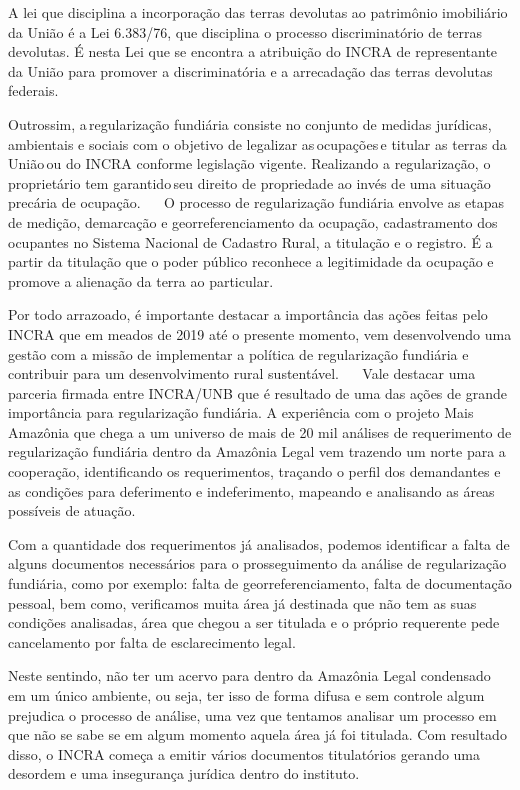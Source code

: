 \documentclass[
  letterpaper,
]{report}
\begin{document}
A lei que disciplina a incorporação das terras devolutas ao patrimônio
imobiliário da União é a Lei 6.383/76, que disciplina o processo
discriminatório de terras devolutas. É nesta Lei que se encontra a
atribuição do INCRA de representante da União para promover a
discriminatória e a arrecadação das terras devolutas federais.~~

Outrossim, a\,regularização fundiária consiste no conjunto de medidas
jurídicas, ambientais e sociais com o objetivo de legalizar
as\,ocupações\,e titular as terras da União\,ou do INCRA conforme
legislação vigente. Realizando a regularização, o proprietário tem
garantido\,seu direito de propriedade ao invés de uma situação precária
de ocupação.\,\,~~ O processo de regularização fundiária envolve as
etapas de medição, demarcação e georreferenciamento da ocupação,
cadastramento dos ocupantes no Sistema Nacional de Cadastro Rural, a
titulação e o registro. É a partir da titulação que o poder público
reconhece a legitimidade da ocupação e promove a alienação da terra ao
particular.~~

Por todo arrazoado, é importante destacar a importância das ações feitas
pelo INCRA que em meados de 2019 até o presente momento, vem
desenvolvendo uma gestão com a missão de implementar a política de
regularização fundiária e contribuir para um desenvolvimento rural
sustentável.~ ~ Vale destacar uma parceria firmada entre INCRA/UNB que é
resultado de uma das ações de grande importância para regularização
fundiária. A experiência com o projeto Mais Amazônia que chega a um
universo de mais de 20 mil análises de requerimento de regularização
fundiária dentro da Amazônia Legal vem trazendo um norte para a
cooperação, identificando os requerimentos, traçando o perfil dos
demandantes e as condições para deferimento e indeferimento, mapeando e
analisando as áreas possíveis de atuação.~~

Com a quantidade dos requerimentos já analisados, podemos identificar a
falta de alguns documentos necessários para o prosseguimento da análise
de regularização fundiária, como por exemplo: falta de
georreferenciamento, falta de documentação pessoal, bem como,
verificamos muita área já destinada que não tem as suas condições
analisadas, área que chegou a ser titulada e o próprio requerente pede
cancelamento por falta de esclarecimento legal.~~

Neste sentindo, não ter um acervo para dentro da Amazônia Legal
condensado em um único ambiente, ou seja, ter isso de forma difusa e sem
controle algum prejudica o processo de análise, uma vez que tentamos
analisar um processo em que não se sabe se em algum momento aquela área
já foi titulada. Com resultado disso, o INCRA começa a emitir vários
documentos titulatórios gerando uma desordem e uma insegurança jurídica
dentro do instituto.~~
\end{document}
